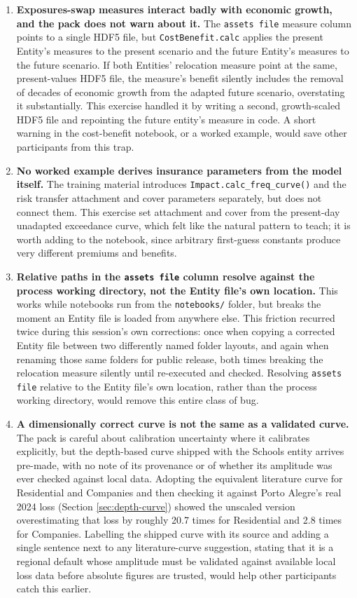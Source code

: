 \documentclass[11pt]{article}
\begin{document}
\begin{enumerate}
\item \textbf{Exposures-swap measures interact badly with economic growth, and the pack
does not warn about it.} The \texttt{assets file} measure column points to a single HDF5
file, but \texttt{CostBenefit.calc} applies the present Entity's measures to the present
scenario and the future Entity's measures to the future scenario. If both Entities'
relocation measure point at the same, present-values HDF5 file, the measure's benefit
silently includes the removal of decades of economic growth from the adapted future
scenario, overstating it substantially. This exercise handled it by writing a second,
growth-scaled HDF5 file and repointing the future entity's measure in code. A short warning
in the cost-benefit notebook, or a worked example, would save other participants from this
trap.

\item \textbf{No worked example derives insurance parameters from the model itself.} The
training material introduces \texttt{Impact.calc\_freq\_curve()} and the risk transfer
attachment and cover parameters separately, but does not connect them. This exercise set
attachment and cover from the present-day unadapted exceedance curve, which felt like the
natural pattern to teach; it is worth adding to the notebook, since arbitrary first-guess
constants produce very different premiums and benefits.

\item \textbf{Relative paths in the \texttt{assets file} column resolve against the process
working directory, not the Entity file's own location.} This works while notebooks run from
the \texttt{notebooks/} folder, but breaks the moment an Entity file is loaded from
anywhere else. This friction recurred twice during this session's own corrections: once
when copying a corrected Entity file between two differently named folder layouts, and
again when renaming those same folders for public release, both times breaking the
relocation measure silently until re-executed and checked. Resolving \texttt{assets file}
relative to the Entity file's own location, rather than the process working directory,
would remove this entire class of bug.

\item \textbf{A dimensionally correct curve is not the same as a validated curve.} The pack
is careful about calibration uncertainty where it calibrates explicitly, but the
depth-based curve shipped with the Schools entity arrives pre-made, with no note of its
provenance or of whether its amplitude was ever checked against local data. Adopting the
equivalent literature curve for Residential and Companies and then checking it against
Porto Alegre's real 2024 loss (Section \ref{sec:depth-curve}) showed the unscaled version
overestimating that loss by roughly 20.7 times for Residential and 2.8 times for Companies.
Labelling the shipped curve with its source and adding a single sentence next to any
literature-curve suggestion, stating that it is a regional default whose amplitude must be
validated against available local loss data before absolute figures are trusted, would help
other participants catch this earlier.


\end{enumerate}
\end{document}
